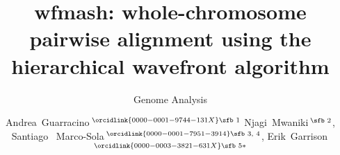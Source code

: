 \documentclass{bioinfo}
\theoremstyle{definition}
\begin{document}

\subtitle{Genome Analysis}

\title[wfmash: whole-cromosome pairwise aligner]{wfmash: whole-chromosome pairwise alignment using the hierarchical wavefront algorithm}
\author[Guarracino \textit{et~al}.]{
Andrea~Guarracino\,$^{\orcidlink{0000-0001-9744-131X}\text{\sfb 1}}$
Njagi~Mwaniki\,$^{\text{\sfb 2}}$,
Santiago~ Marco-Sola\,$^{\orcidlink{0000-0001-7951-3914}\text{\sfb 3, 4}}$,
Erik~Garrison\,$^{\orcidlink{0000-0003-3821-631X}\text{\sfb 5}*}$
}

\address{
$^{\text{\sf 1}}$Genomics Research Centre, Human Technopole, Milan, Italy \\
$^{\text{\sf 2}}$Department of Computer Sciences, University of Pisa, Pisa, Italy \\
$^{\text{\sf 3}}$Department of Computer Sciences, Barcelona Supercomputing Center, Barcelona 08034, Spain \\
$^{\text{\sf 4}}$Departament d’Arquitectura de Computadors i Sistemes Operatius, Universitat Autònoma de Barcelona, Barcelona 08193, Spain \\
$^{\text{\sf 5}}$University of Tennessee Health Science Center, Memphis, TN, USA
}




\end{document}
